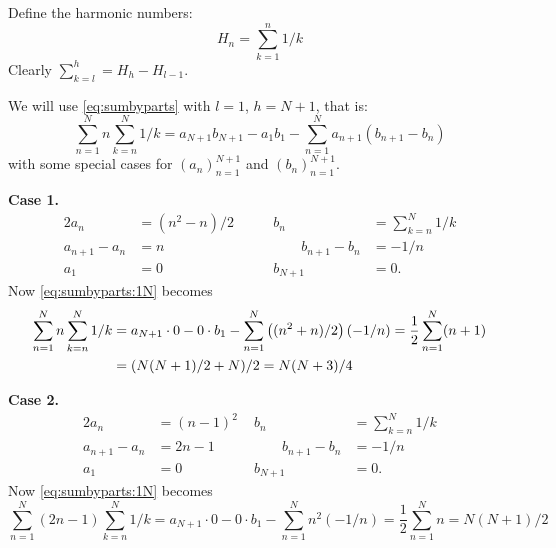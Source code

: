 \begin{enumerate}
Define the harmonic numbers:
\begin{equation} \label{eq:harmonic:numbers}
H_n = \sum_{k=1}^n 1/k
\end{equation}
Clearly \(\sum_{k=l}^h = H_h - H_{l-1}\).

We will use \eqref{eq:sumbyparts} with \(l=1\), \(h=N+1\), that is:
\begin{equation}   \label{eq:sumbyparts:1N}
\sum_{n=1}^N n \sum_{k=n}^N 1/k
= a_{N+1}b_{N+1} - a_1 b_1 - \sum_{n=1}^N a_{n+1}(b_{n+1} - b_n)
\end{equation}
with some special cases for
\((a_n)_{n=1}^{N+1}\) and \((b_n)_{n=1}^{N+1}\).

\textbf{Case 1.}
\begin{alignat*}{2}
a_n &= (n^2-n)/2  \qquad  &           b_n &= \sum_{k=n}^N 1/k \\
a_{n+1} - a_n &= n  &  \qquad b_{n+1} - b_n &= -1/n \\
a_1 &= 0           &               b_{N+1} &= 0.
\end{alignat*}
Now \eqref{eq:sumbyparts:1N} becomes
\begin{align}
\sum_{n=1}^N n \sum_{k=n}^N 1/k
&= a_{N+1}\cdot 0 - 0 \cdot b_1 - \sum_{n=1}^N \left((n^2+n)/2\right)(-1/n)
= \frac{1}{2} \sum_{n=1}^N (n+1)
\notag \\
&= (N(N+1)/2+N)/2
 = N(N+3)/4 \label{eq:harmonic:case1}
\end{align}


\textbf{Case 2.}
\begin{alignat*}{2}
a_n &= (n-1)^2      &           b_n &= \sum_{k=n}^N 1/k \\
a_{n+1} - a_n &= 2n-1 \qquad &  \qquad b_{n+1} - b_n &= -1/n \\
a_1 &= 0              &               b_{N+1} &= 0.
\end{alignat*}
Now \eqref{eq:sumbyparts:1N} becomes
\begin{equation*}
\sum_{n=1}^N (2n-1) \sum_{k=n}^N 1/k
= a_{N+1}\cdot 0 - 0 \cdot b_1 - \sum_{n=1}^N n^2(-1/n)
= \frac{1}{2} \sum_{n=1}^N n
= N(N+1)/2
\end{equation*}



\end{enumerate}
